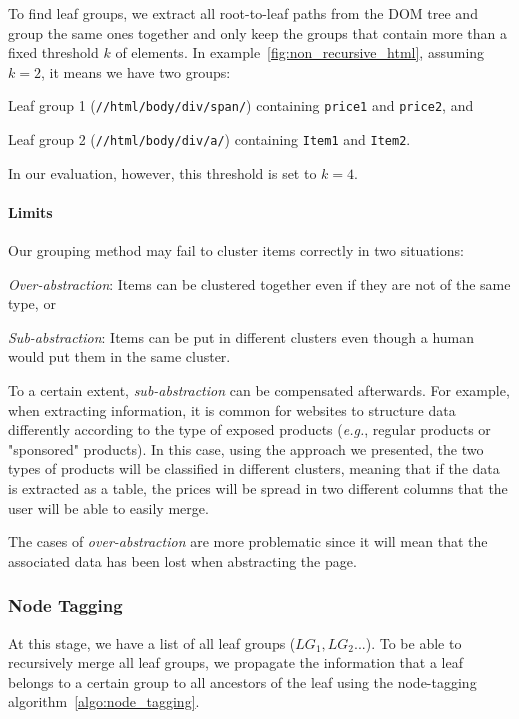 To find leaf groups, we extract all root-to-leaf paths from the DOM tree and group the same ones together
and only keep the groups that contain more than a fixed threshold $k$ of elements.
In example~\ref{fig:non_recursive_html}, assuming $k=2$, it means we have two groups:
\begin{compactenum}
  \item Leaf group 1 (\texttt{//html/body/div/span/}) containing \texttt{price1} and \texttt{price2}, and
  \item Leaf group 2 (\texttt{//html/body/div/a/}) containing \texttt{Item1} and \texttt{Item2}.
\end{compactenum}
In our evaluation, however, this threshold is set to $k=4$.

\paragraph{Limits}
Our grouping method may fail to cluster items correctly in two situations:
\begin{compactitem}
  \item \emph{Over-abstraction}: Items can be clustered together even if they are not of the same type, or
  \item \emph{Sub-abstraction}: Items can be put in different clusters even though a human would put them in the same cluster.
\end{compactitem}
To a certain extent, \emph{sub-abstraction} can be compensated afterwards.
For example, when extracting information, it is common for websites to structure data differently according to the type of exposed products (\emph{e.g.}, regular products or "sponsored" products). 
In this case, using the approach we presented, the two types of products will be classified in different clusters, meaning that if the data is extracted as a table, the prices will be spread in two different columns that the user will be able to easily merge.

The cases of \emph{over-abstraction} are more problematic since it will mean that the associated data has been lost when abstracting the page.

\subsubsection{Node Tagging}
\label{appstract:sec:node_tagging}
At this stage, we have a list of all leaf groups ($LG_1, LG_2...$). 
To be able to recursively merge all leaf groups, we propagate the information that a leaf belongs to a certain group to all ancestors of the leaf using the node-tagging algorithm~\ref{algo:node_tagging}.


